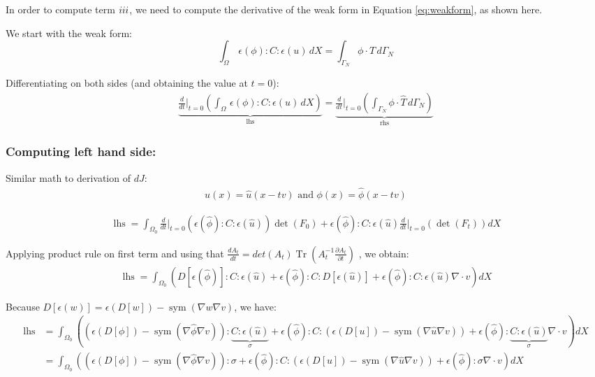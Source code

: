 \documentclass[11pt]{article}
\DeclareMathOperator{\Tr}{Tr}
\DeclareMathOperator{\sym}{sym}
\DeclareMathOperator{\lhs}{lhs}
\newcommand{\RNum}[1]{\uppercase\expandafter{\romannumeral #1\relax}}
\begin{document}
In order to compute term $\RNum{3}$, we need to compute the derivative of the weak form in Equation \ref{eq:weakform}, as shown here.

We start with the weak form:
$$
\int_\Omega\, \epsilon(\phi) : C : \epsilon(u)\, dX = \int_{\Gamma_N} \phi \cdot \hat T\, d\Gamma_N
$$

Differentiating on both sides (and obtaining the value at $t=0$):
\begin{align*}
  \underbrace{\frac{d}{dt} \Big|_{t=0} \left( \int_\Omega\, \epsilon(\phi) : C : \epsilon(u)\, dX \right)}_{\text{lhs}} = \underbrace{\frac{d}{dt} \Big|_{t=0} \left( \int_{\Gamma_N} \phi \cdot \hat T\, d\Gamma_N\right)}_{\text{rhs}}
\end{align*}

\subsubsection{Computing left hand side:}
Similar math to derivation of $dJ$:
\begin{align*}
  u(x) = \hat u(x - tv) \text{ and } \phi(x) = \hat \phi(x - tv)  
\end{align*}
  
\begin{align*}
  \lhs = \int_{\Omega_0} \frac{d}{dt}\Big|_{t=0}  \left( \epsilon(\hat \phi):C:\epsilon(\hat u) \right) \det(F_0) + \epsilon(\hat \phi):C:\epsilon(\hat u) \frac{d}{dt} \Big|_{t=0} \left(\det(F_t)\right) dX
\end{align*}

Applying product rule on first term and using that $\frac{dA_t}{dt} = det(A_t)\Tr(A_t^{-1} \frac{\partial A_t}{\partial t})$ , we obtain:
\begin{align*}
  \lhs = \int_{\Omega_0} \left( D[\epsilon(\hat \phi)]:C:\epsilon(\hat u) + \epsilon(\hat \phi):C:D[\epsilon(\hat u)] + \epsilon(\hat \phi): C : \epsilon(\hat u) \nabla \cdot v \right) dX
\end{align*}

Because $D[\epsilon(w)] = \epsilon(D[w])  - \sym(\nabla w \nabla v)$, we have:
\begin{align*}
  \lhs &=  \int_{\Omega_0} \left((\epsilon(D[\phi])  - \sym(\nabla \hat \phi \nabla v)):\underbrace{C:\epsilon(\hat u)}_{\sigma} + \epsilon(\hat \phi):C:(\epsilon(D[u])  - \sym(\nabla \hat u \nabla v)) + \epsilon(\hat \phi): \underbrace{C : \epsilon(\hat u)}_{\sigma} \nabla \cdot v \right) dX\\
  &= \int_{\Omega_0} \left((\epsilon(D[\phi])  - \sym(\nabla \hat \phi \nabla v)):\sigma + \epsilon(\hat \phi):C:(\epsilon(D[u])  - \sym(\nabla \hat u \nabla v)) + \epsilon(\hat \phi): \sigma \nabla \cdot v \right) dX
\end{align*}
\end{document}
